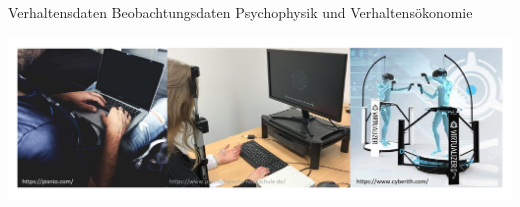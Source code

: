 \documentclass[
  8pt,
  ignorenonframetext,
]{beamer}
\begin{document}
\begin{frame}{Verhaltensdaten}
\protect\hypertarget{verhaltensdaten-1}{}
Beobachtungsdaten \textbar{} Psychophysik und Verhaltensökonomie
\vspace{10mm}

\begin{center}\includegraphics[width=1\linewidth]{3_Abbildungen/pfm_3_verhaltensdatenaufnahme} \end{center}
\end{frame}
\end{document}
